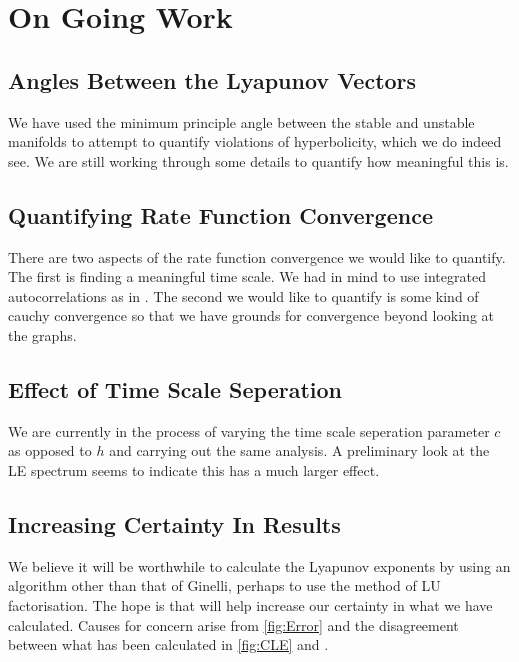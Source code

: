 \section{On Going Work}

\subsection{Angles Between the Lyapunov Vectors}

We have used the minimum principle angle between the stable and unstable manifolds to attempt to quantify violations of hyperbolicity, which we do indeed see. We are still working through some details to quantify how meaningful this is.

\subsection{Quantifying Rate Function Convergence}

There are two aspects of the rate function convergence we would like to quantify. The first is finding a meaningful time scale. We had in mind to use integrated autocorrelations as in \cite{Galfi2019}. The second we would like to quantify is some kind of cauchy convergence so that we have grounds for convergence beyond looking at the graphs.

\subsection{Effect of Time Scale Seperation}

We are currently in the process of varying the time scale seperation parameter $c$ as opposed to $h$ and carrying out the same analysis. A preliminary look at the LE spectrum seems to indicate this has a much larger effect.

\subsection{Increasing Certainty In Results}

We believe it will be worthwhile to calculate the Lyapunov exponents by using an algorithm other than that of Ginelli, perhaps to use the method of LU factorisation. The hope is that will help increase our certainty in what we have calculated. Causes for concern arise from \ref{fig:Error} and the disagreement between what has been calculated in \ref{fig:CLE} and \cite{Carlu2019}.
